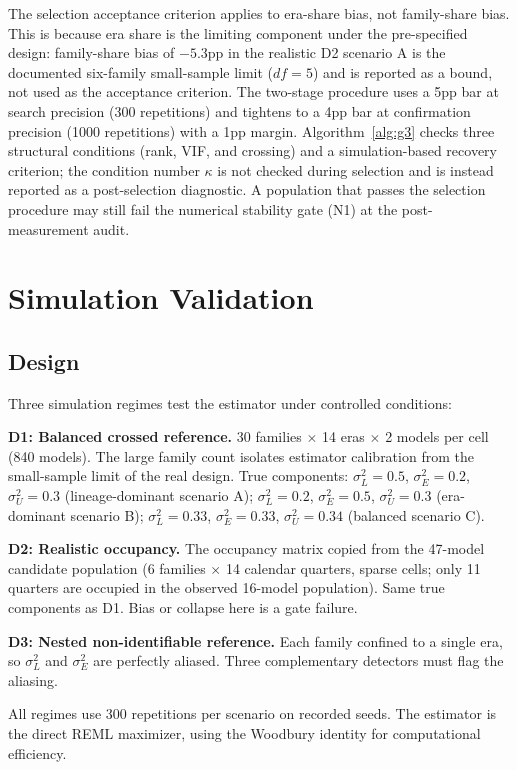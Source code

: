 \documentclass{ieeeaccess}
\theoremstyle{definition}
\theoremstyle{plain}
\begin{document}
The selection acceptance criterion applies to era-share bias, not family-share bias. This is because era share is the limiting component under the pre-specified design: family-share bias of $-5.3$pp in the realistic D2 scenario A is the documented six-family small-sample limit ($df = 5$) and is reported as a bound, not used as the acceptance criterion. The two-stage procedure uses a 5pp bar at search precision (300 repetitions) and tightens to a 4pp bar at confirmation precision (1000 repetitions) with a 1pp margin. Algorithm~\ref{alg:g3} checks three structural conditions (rank, VIF, and crossing) and a simulation-based recovery criterion; the condition number $\kappa$ is not checked during selection and is instead reported as a post-selection diagnostic. A population that passes the selection procedure may still fail the numerical stability gate (N1) at the post-measurement audit.

\section{Simulation Validation}
\label{sec:sim}

\subsection{Design}
Three simulation regimes test the estimator under controlled conditions:

\textbf{D1: Balanced crossed reference.} 30 families $\times$ 14 eras $\times$ 2 models per cell (840 models). The large family count isolates estimator calibration from the small-sample limit of the real design. True components: $\sigma^2_L = 0.5$, $\sigma^2_E = 0.2$, $\sigma^2_U = 0.3$ (lineage-dominant scenario A); $\sigma^2_L = 0.2$, $\sigma^2_E = 0.5$, $\sigma^2_U = 0.3$ (era-dominant scenario B); $\sigma^2_L = 0.33$, $\sigma^2_E = 0.33$, $\sigma^2_U = 0.34$ (balanced scenario C).

\textbf{D2: Realistic occupancy.} The occupancy matrix copied from the 47-model candidate population (6 families $\times$ 14 calendar quarters, sparse cells; only 11 quarters are occupied in the observed 16-model population). Same true components as D1. Bias or collapse here is a gate failure.

\textbf{D3: Nested non-identifiable reference.} Each family confined to a single era, so $\sigma^2_L$ and $\sigma^2_E$ are perfectly aliased. Three complementary detectors must flag the aliasing.

All regimes use 300 repetitions per scenario on recorded seeds. The estimator is the direct REML maximizer, using the Woodbury identity for computational efficiency.
\end{document}
